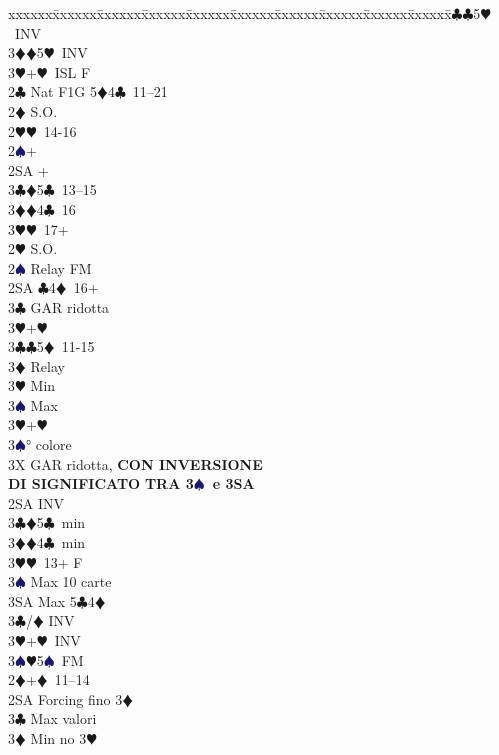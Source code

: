 \documentclass[a4paper,italian]{article}
\newcommand{\BC}{\textcolor{OliveGreen}{$\clubsuit$}}
\newcommand{\BD}{\textcolor{RedOrange}{$\vardiamondsuit$}}
\newcommand{\BH}{\textcolor{Red2}{$\varheartsuit${}}}
\newcommand{\BS}{\textcolor{MidnightBlue}{$\spadesuit${}}}
\newenvironment{bidtable}
{\begin{tabbing}

    xxxxxx\=xxxxxx\=xxxxxx\=xxxxxx\=xxxxxx\=xxxxxx\=xxxxxx\=xxxxxx\=xxxxxx\=xxxxxx\=\kill}
{\end{tabbing} }%
\begin{document}
\begin{multicols}{2}
\begin{bidtable}
        3\BC {}\BC 5\BH\ INV\\
        3\BD {}\BD 5\BH\ INV\\
        3\BH {}+\BH\ ISL F\-\\
        2\BC \> Nat F1G 5\BD 4\BC\ 11--21\+\\
        2\BD \> S.O.\+\\
        2\BH {}\BH\ 14-16\\
        2\BS {}+\\
        2SA +\\
        3\BC {}\BD 5\BC\ 13--15\\
        3\BD {}\BD 4\BC\ 16\\
        3\BH {}\BH\ 17+\-\\
        2\BH \> S.O.\\
        2\BS \> Relay FM\+\\
        2SA \BC 4\BD\ 16+\+\\
        3\BC \> GAR ridotta\\
        3\BH {}+\BH \-\\
        3\BC {}\BC 5\BD\ 11-15\+\\
        3\BD \> Relay\+\\
        3\BH \> Min\\
        3\BS \> Max\-\\
        3\BH {}+\BH \\
        3\BS {}° colore\-\\
        3X \> GAR ridotta, \textbf{CON INVERSIONE}\+\\
        \textbf{DI SIGNIFICATO}
        \textbf{TRA 3\BS\ e 3SA}\-\-\\
        2SA \> INV\+\\
        3\BC {}\BD 5\BC\ min\\
        3\BD {}\BD 4\BC\ min\\
        3\BH {}\BH\ 13+ F\\
        3\BS \> Max 10 carte\\
        3SA \> Max 5\BC 4\BD \-\\
        3\BC/\BD \> INV\\
        3\BH {}+\BH\ INV\\
        3\BS {}\BH 5\BS\ FM\-\\
        2\BD {}+\BD\ 11--14\+\\
        2SA \> Forcing fino 3\BD \+\\
        3\BC \> Max valori\\
        3\BD \> Min no 3\BH \\

\end{bidtable}
\end{multicols}
\end{document}
